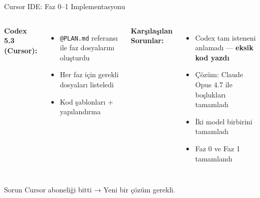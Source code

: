 \documentclass[10pt,aspectratio=43]{beamer}
\begin{document}
\begin{frame}{Cursor IDE: Faz 0–1 Implementasyonu}
  \begin{columns}[T]
    \textbf{Codex 5.3 (Cursor):}
    \vspace{0.3em}
    \begin{itemize}
      \setlength{\itemsep}{0.5em}
      \item \texttt{@PLAN.md} referansı ile faz dosyalarını oluşturdu
      \item Her faz için gerekli dosyaları listeledi
      \item Kod şablonları + yapılandırma
    \end{itemize}

    \textbf{Karşılaşılan Sorunlar:}
    \vspace{0.3em}
    \begin{itemize}
      \setlength{\itemsep}{0.5em}
      \item Codex tam isteneni anlamadı — \textbf{eksik kod yazdı}
      \item \alert{Çözüm:} Claude Opus 4.7 ile boşlukları tamamladı
      \item İki model birbirini tamamladı
      \item Faz 0 ve Faz 1 tamamlandı
    \end{itemize}
  \end{columns}

  \vspace{0.5em}
  \begin{alertblock}{Sorun}
    Cursor aboneliği bitti → Yeni bir çözüm gerekli.
  \end{alertblock}
\end{frame}
\end{document}
